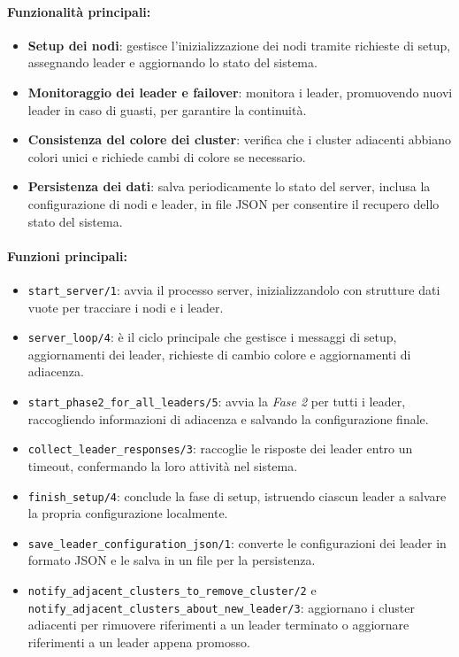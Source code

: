 \documentclass[12pt, a4paper]{report}
\begin{document}
\paragraph{Funzionalità principali:}
\begin{itemize}
    \item \textbf{Setup dei nodi}: gestisce l'inizializzazione dei nodi tramite richieste di setup, assegnando leader e aggiornando lo stato del sistema.
    \item \textbf{Monitoraggio dei leader e failover}: monitora i leader, promuovendo nuovi leader in caso di guasti, per garantire la continuità.
    \item \textbf{Consistenza del colore dei cluster}: verifica che i cluster adiacenti abbiano colori unici e richiede cambi di colore se necessario.
    \item \textbf{Persistenza dei dati}: salva periodicamente lo stato del server, inclusa la configurazione di nodi e leader, in file JSON per consentire il recupero dello stato del sistema.
\end{itemize}

\paragraph{Funzioni principali:}
\begin{itemize}
    \item \texttt{start\_server/1}: avvia il processo server, inizializzandolo con strutture dati vuote per tracciare i nodi e i leader.
    \item \texttt{server\_loop/4}: \`e il ciclo principale che gestisce i messaggi di setup, aggiornamenti dei leader, richieste di cambio colore e aggiornamenti di adiacenza.
    \item \texttt{start\_phase2\_for\_all\_leaders/5}: avvia la \textit{Fase 2} per tutti i leader, raccogliendo informazioni di adiacenza e salvando la configurazione finale.
    \item \texttt{collect\_leader\_responses/3}: raccoglie le risposte dei leader entro un timeout, confermando la loro attività nel sistema.
    \item \texttt{finish\_setup/4}: conclude la fase di setup, istruendo ciascun leader a salvare la propria configurazione localmente.
    \item \texttt{save\_leader\_configuration\_json/1}: converte le configurazioni dei leader in formato JSON e le salva in un file per la persistenza.
    \item \texttt{notify\_adjacent\_clusters\_to\_remove\_cluster/2} e \\ \texttt{notify\_adjacent\_clusters\_about\_new\_leader/3}: aggiornano i cluster adiacenti per rimuovere riferimenti a un leader terminato o aggiornare riferimenti a un leader appena promosso.
\end{itemize}
\end{document}

